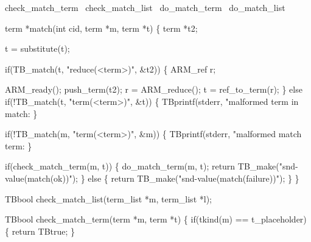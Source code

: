 


\nwenddocs{}\endmoddef\let\nwnotused=\nwoutput{}
\LA{}check_match_term~{\nwtagstyle{}}\RA{}
\LA{}check_match_list~{\nwtagstyle{}}\RA{}
\LA{}do_match_term~{\nwtagstyle{}}\RA{}
\LA{}do_match_list~{\nwtagstyle{}}\RA{}
\nwendcode{}\nwdocspar


\nwenddocs{}\plusendmoddef\let\nwnotused=\nwoutput{}
term *match(int cid, term *m, term *t)
\{
  term *t2;

  t = substitute(t);

  if(TB_match(t, "reduce(<term>)", &t2)) \{
    ARM_ref r;

    ARM_ready();
    push_term(t2);
    r = ARM_reduce();
    t = ref_to_term(r);
  \} else if(!TB_match(t, "term(<term>)", &t)) \{
    TBprintf(stderr, "malformed term in match: %
  \}

  if(!TB_match(m, "term(<term>)", &m)) \{
    TBprintf(stderr, "malformed match term: %
  \}

  if(check_match_term(m, t)) \{
    do_match_term(m, t);
    return TB_make("snd-value(match(ok))");
  \} else \{
    return TB_make("snd-value(match(failure))");
  \} 
\}
\nwendcode{}\nwdocspar



\nwenddocs{}\endmoddef\let\nwnotused=\nwoutput{}
TBbool check_match_list(term_list *m, term_list *l);

TBbool check_match_term(term *m, term *t)
\{
  if(tkind(m) == t_placeholder) \{
    return TBtrue;
  \}

